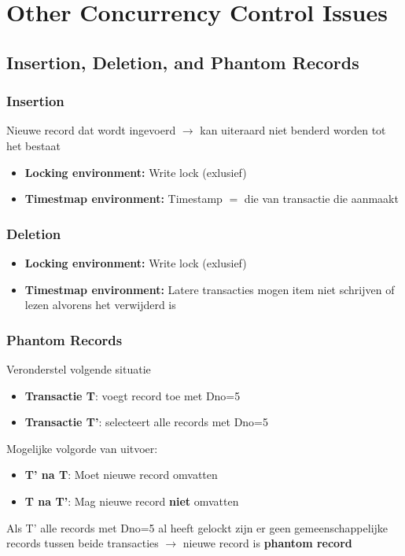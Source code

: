 \section{Other Concurrency Control Issues}%
\subsection{Insertion, Deletion, and Phantom Records}%
\subsubsection{Insertion}
Nieuwe record dat wordt ingevoerd $\rightarrow$ kan uiteraard niet benderd worden tot het bestaat
\begin{itemize}
	\item \textbf{Locking environment:} Write lock (exlusief)
	\item \textbf{Timestmap environment:} Timestamp $=$ die van transactie die aanmaakt 
\end{itemize}

\subsubsection{Deletion}
\begin{itemize}
	\item \textbf{Locking environment:} Write lock (exlusief)
	\item \textbf{Timestmap environment:} Latere transacties mogen item niet schrijven of lezen alvorens het verwijderd is
\end{itemize}

\subsubsection{Phantom Records}
Veronderstel volgende situatie
\begin{itemize}
	\item \textbf{Transactie T}: voegt record toe met Dno=5
	\item \textbf{Transactie T'}: selecteert alle records met Dno=5 
\end{itemize}
Mogelijke volgorde van uitvoer:
\begin{itemize}
	\item \textbf{T' na T}: Moet nieuwe record omvatten
	\item \textbf{T na T'}: Mag nieuwe record \textbf{niet} omvatten 
\end{itemize}
Als T' alle records met Dno=5 al heeft gelockt zijn er geen gemeenschappelijke records tussen beide transacties $\rightarrow$ nieuwe record is \textbf{phantom record}

